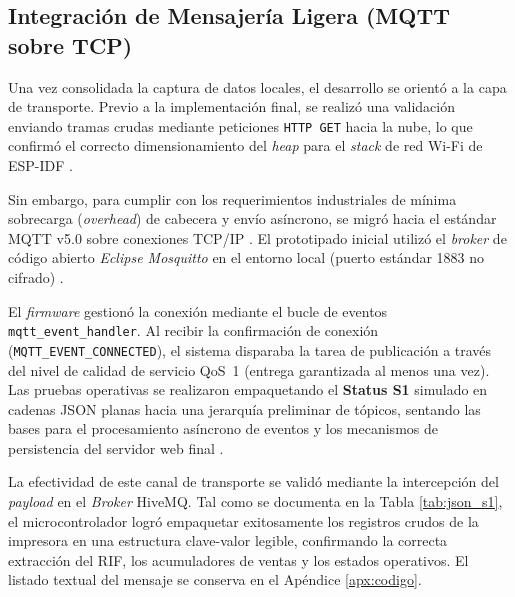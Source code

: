 \subsection{Integración de Mensajería Ligera (MQTT sobre TCP)}\label{sec:mqtt_tcp}

\par Una vez consolidada la captura de datos locales, el desarrollo se orientó a la capa de transporte. Previo a la implementación final, se realizó una validación enviando tramas crudas mediante peticiones \texttt{HTTP GET} hacia la nube, lo que confirmó el correcto dimensionamiento del \textit{heap} para el \textit{stack} de red Wi-Fi de ESP-IDF \cite{Espressif_ESP_IDF_v552}.\\

\par Sin embargo, para cumplir con los requerimientos industriales de mínima sobrecarga (\textit{overhead}) de cabecera y envío asíncrono, se migró hacia el estándar MQTT v5.0 sobre conexiones TCP/IP \cite{OASIS_MQTT_v5}. El prototipado inicial utilizó el \textit{broker} de código abierto \textit{Eclipse Mosquitto} en el entorno local (puerto estándar 1883 no cifrado) \cite{OASIS_MQTT_v5}.\\

\par El \textit{firmware} gestionó la conexión mediante el bucle de eventos \texttt{mqtt\_event\_handler}. Al recibir la confirmación de conexión (\texttt{MQTT\_EVENT\_CONNECTED}), el sistema disparaba la tarea de publicación a través del nivel de calidad de servicio QoS~1 (entrega garantizada al menos una vez). Las pruebas operativas se realizaron empaquetando el \textbf{Status S1} simulado en cadenas JSON planas hacia una jerarquía preliminar de tópicos, sentando las bases para el procesamiento asíncrono de eventos y los mecanismos de persistencia del servidor web final \cite{Django_v5_Doc}.\\

\par La efectividad de este canal de transporte se validó mediante la intercepción del \textit{payload} en el \textit{Broker} HiveMQ. Tal como se documenta en la Tabla \ref{tab:json_s1}, el microcontrolador logró empaquetar exitosamente los registros crudos de la impresora en una estructura clave-valor legible, confirmando la correcta extracción del RIF, los acumuladores de ventas y los estados operativos. El listado textual del mensaje se conserva en el Apéndice \ref{apx:codigo}.

